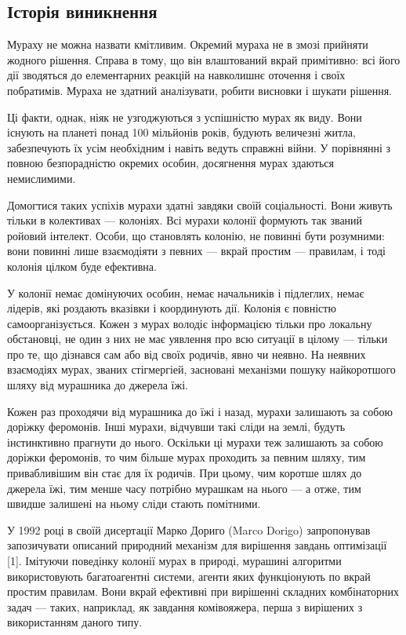 \documentclass[a4paper, 12pt]{article}
\numberwithin{equation}{section}
\begin{document}
\subsection{Історія виникнення}

Мураху не можна назвати кмітливим. Окремий мураха не в змозі прийняти жодного рішення. Справа в тому, що він влаштований вкрай примітивно: всі його дії зводяться до елементарних реакцій на навколишнє оточення і своїх побратимів. Мураха не здатний аналізувати, робити висновки і шукати рішення. \medskip

Ці факти, однак, ніяк не узгоджуються з успішністю мурах як виду. Вони існують на планеті понад 100 мільйонів років, будують величезні житла, забезпечують їх усім необхідним і навіть ведуть справжні війни. У порівнянні з повною безпорадністю окремих особин, досягнення мурах здаються немислимими. \medskip

Домогтися таких успіхів мурахи здатні завдяки своїй соціальності. Вони живуть тільки в колективах --- колоніях. Всі мурахи колонії формують так званий ройовий інтелект. Особи, що становлять колонію, не повинні бути розумними: вони повинні лише взаємодіяти з певних --- вкрай простим --- правилам, і тоді колонія цілком буде ефективна. \medskip

У колонії немає домінуючих особин, немає начальників і підлеглих, немає лідерів, які роздають вказівки і координують дії. Колонія є повністю самоорганізується. Кожен з мурах володіє інформацією тільки про локальну обстановці, не один з них не має уявлення про всю ситуації в цілому --- тільки про те, що дізнався сам або від своїх родичів, явно чи неявно. На неявних взаємодіях мурах, званих стігмергіей, засновані механізми пошуку найкоротшого шляху від мурашника до джерела їжі. \medskip

Кожен раз проходячи від мурашника до їжі і назад, мурахи залишають за собою доріжку феромонів. Інші мурахи, відчувши такі сліди на землі, будуть інстинктивно прагнути до нього. Оскільки ці мурахи теж залишають за собою доріжки феромонів, то чим більше мурах проходить за певним шляху, тим привабливішим він стає для їх родичів. При цьому, чим коротше шлях до джерела їжі, тим менше часу потрібно мурашкам на нього --- а отже, тим швидше залишені на ньому сліди стають помітними. \medskip

У 1992 році в своїй дисертації Марко Дориго (Marco Dorigo) запропонував запозичувати описаний природний механізм для вирішення завдань оптимізації [1]. Імітуючи поведінку колонії мурах в природі, мурашині алгоритми використовують багатоагентні системи, агенти яких функціонують по вкрай простим правилам. Вони вкрай ефективні при вирішенні складних комбінаторних задач --- таких, наприклад, як завдання комівояжера, перша з вирішених з використанням даного типу.
\end{document}
